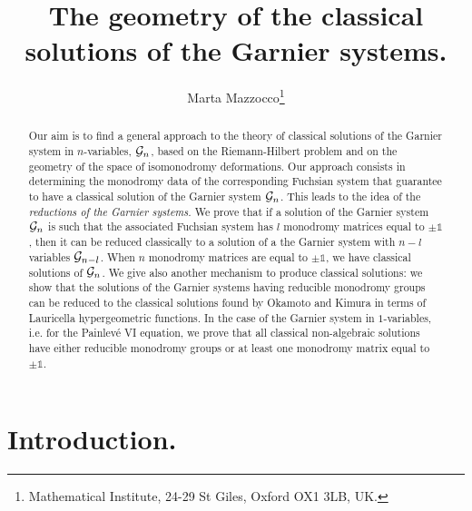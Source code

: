 \documentclass[12pt]{article}
\newcommand{\ID}{\mathbb{1}}
\theoremstyle{definition}
\theoremstyle{theorem}
\begin{document}
\title{{\bf The geometry of the classical solutions of the Garnier systems.}}
\author{Marta Mazzocco\thanks{Mathematical
Institute, 24-29 St Giles, Oxford OX1 3LB, UK.}} 
\date{}
\maketitle

\begin{abstract}
Our aim is to find a general approach to the theory of classical 
solutions of the Garnier system in $n$-variables, ${\cal G}_n$, 
based on the Riemann-Hilbert problem and on the geometry of the 
space of isomonodromy deformations. Our approach consists in 
determining the monodromy data of the corresponding Fuchsian system 
that guarantee to have a classical solution of the Garnier system 
${\cal G}_n$. 
This leads to the idea of the {\it reductions of the Garnier systems.}\/ 
We prove that if a solution of the Garnier system ${\cal G}_{n}$ 
is such that the associated Fuchsian system has $l$ monodromy matrices
equal to $\pm\ID$, then it can be reduced classically to a solution
of a the Garnier system with $n-l$ variables ${\cal G}_{n-l}$. When $n$ 
monodromy matrices are equal to $\pm\ID$, we have classical solutions 
of ${\cal G}_n$.
We give also another mechanism to produce classical solutions:
we show that the solutions of the Garnier systems having reducible
monodromy groups can be reduced to the classical solutions found by 
Okamoto and Kimura in terms of Lauricella hypergeometric functions.
In the case of the Garnier system in $1$-variables, i.e. for the  
Painlev\'e VI equation, we prove that all classical non-algebraic 
solutions have either reducible monodromy groups or at least one 
monodromy matrix equal to $\pm\ID$.
\end{abstract}

\section{Introduction.}
\end{document}
